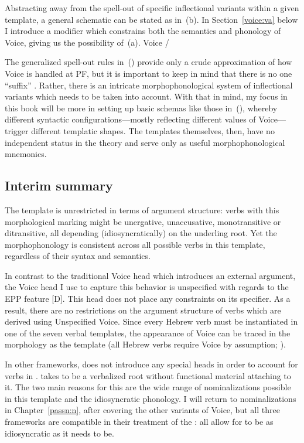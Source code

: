 {Abstracting away from the spell-out of specific inflectional variants within a given template, a general schematic can be stated as in~(\nextx b). In Section~\ref{voice:va} below I introduce a modifier which constrains both the semantics and phonology of Voice, giving us the possibility of~(\nextx a).
\pex Voice {\lra}
	\a {\tpie} / {\trace} {\va}
	\a {\tkal}
\xe

The generalized spell-out rules in~(\lastx) provide only a crude approximation of how Voice is handled at PF, but it is important to keep in mind that there is no one ``suffix'' {\tkal}. Rather, there is an intricate morphophonological system of inflectional variants which needs to be taken into account. With that in mind, my focus in this book will be more in setting up basic schemas like those in~(\lastx), whereby different syntactic configurations---mostly reflecting different values of Voice---trigger different templatic shapes. The templates themselves, then, have no independent status in the theory and serve only as useful morphophonological mnemonics.

	\subsection{Interim summary} \label{voice:voice:sum}
The template {\tkal} is unrestricted in terms of argument structure: verbs with this morphological marking might be unergative, unaccusative, monotransitive or ditransitive, all depending (idiosyncratically) on the underling root. Yet the morphophonology is consistent across all possible verbs in this template, regardless of their syntax and semantics.

In contrast to the traditional Voice head which introduces an external argument, the Voice head I use to capture this behavior is unspecified with regards to the EPP feature [D]. This head does not place any constraints on its specifier. As a result, there are no restrictions on the argument structure of verbs which are derived using Unspecified Voice. Since every Hebrew verb must be instantiated in one of the seven verbal templates, the appearance of Voice can be traced in the morphology as the template {\tkal} (all Hebrew verbs require Voice by assumption; \citealt{arad05}).

In other frameworks, \cite{doron03} does not introduce any special heads in order to account for verbs in {\tkal}. \cite{borer13oup,borer15roots} takes {\tkal} to be a verbalized root without functional material attaching to it. The two main reasons for this are the wide range of nominalizations possible in this template and the idiosyncratic phonology. I will return to nominalizations in Chapter~\ref{passn:n}, after covering the other variants of Voice, but all three frameworks are compatible in their treatment of the {\tkal}: all allow for {\tkal} to be as idiosyncratic as it needs to be.

}
